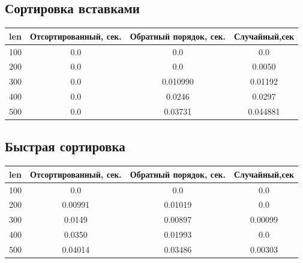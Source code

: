 \documentclass[12pt]{report}
\begin{document}
\subsection{Сортировка вставками}
\begin{center}
	\begin{tabular}{|c c c c|} 
 	\hline
	len & Отсортированный, сек. & Обратный порядок, сек. & Случайный,сек \\ [0.5ex] 
 	\hline\hline
 	100 & 0.0 & 0.0 & 0.0 \\
 	\hline
 	200 & 0.0 & 0.0 & 0.0050\\
 	\hline
	300 & 0.0 & 0.010990 & 0.01192 \\
	\hline
	400 & 0.0 & 0.0246 & 0.0297\\
	\hline
	500 & 0.0 & 0.03731 & 0.044881\\
	\hline
	\end{tabular}
\end{center}

\subsection{Быстрая сортировка}
\begin{center}
	\begin{tabular}{|c c c c|} 
 	\hline
	len & Отсортированный, сек. & Обратный порядок, сек. & Случайный,сек \\ [0.5ex] 
 	\hline\hline
 	100 & 0.0 & 0.0 & 0.0 \\
 	\hline
 	200 & 0.00991 & 0.01019 & 0.0\\
 	\hline
	300 & 0.0149 & 0.00897 & 0.00099 \\
	\hline
	400 & 0.0350 & 0.01993 & 0.0\\
	\hline
	500 & 0.04014 & 0.03486 & 0.00303\\
	\hline
	\end{tabular}
\end{center}
\end{document}
